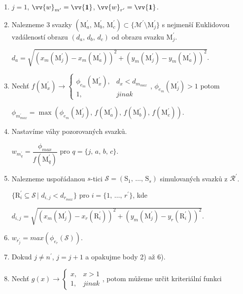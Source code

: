 \begin{enumerate}
\item $j = 1$, $\vv{w}_{m^\prime} = \vv{\mathbf{1}}$, $\vv{w}_{r^\prime} = \vv{\mathbf{1}}$. 

\item Nalezneme 3 svazky $\left(\mathrm{M}^\prime_a,\,\mathrm{M}^\prime_b,\,\mathrm{M}^\prime_c \right) \subset \lbrace \mathcal{M}^\prime\setminus \mathrm{M}^\prime_j\rbrace$ s nejmenší Euklidovou vzdáleností obrazu $\left(d_a,\,d_b,\,d_c\right)$ od obrazu svazku $\mathrm{M}^\prime_j$.

$d_a = \sqrt{\left( x_{m}(\mathrm{M}_j^\prime) -  x_{m}(\mathrm{M}_a^\prime) \right)^2 + \left( y_{m}(\mathrm{M}_j^\prime) -  y_{m}(\mathrm{M}_a^\prime) \right)^2}$.

\item Nechť $f(\mathrm{M}^\prime_x)\rightarrow \begin{cases}
\phi_{e_{m}}\left(\mathrm{M}^\prime_x \right), & d_x < d_{m_{max}}\\
1, & jinak
\end{cases}$, $\phi_{e_{m}}(\mathrm{M}^\prime_j) > 1 $ potom 

$\phi_{m^\prime_{max}} = \max\left(\phi_{e_{m}}(\mathrm{M}^\prime_j),\,f(\mathrm{M}^\prime_a),\,f(\mathrm{M}^\prime_b),\,f(\mathrm{M}^\prime_c)  \right)$. 

\item Nastavíme váhy pozorovaných svazků.

 $w_{m^\prime_{q}} = \dfrac{\phi_{max}}{f(\mathrm{M}^\prime_q)}$ pro $q = \lbrace j,\,a,\,b,\,c \rbrace$.
 
\item Nalezneme uspořádanou $s$-tici $\mathcal{S} = (\mathrm{S}_1,\,\dots,\,\mathrm{S}_s)$ simulovaných svazků z $\mathcal{R}^\prime$. 

$\lbrace \mathrm{R}^\prime_i \subseteq \mathcal{S}\,|\,\, d_{i,j} < d_{r_{max}}  \rbrace$ pro $i = \lbrace 1,\,\dots,\, r^\prime \rbrace$, kde 

$d_{i,j} = \sqrt{\left( x_{m}(\mathrm{M}_j^\prime) -  x_{r}(\mathrm{R}_i^\prime) \right)^2 + \left( y_{m}(\mathrm{M}_j^\prime) -  y_{r}(\mathrm{R}_i^\prime) \right)^2}$.

\item $w_{r^\prime_j} = max\left( \phi_{e_r}(\mathcal{S}) \right)$.

\item Dokud $j \neq n^\prime$, $j = j+1$ a opakujme body 2) až 6). 

\item Nechť  $g(x)\rightarrow \begin{cases}
x, & x > 1\\
1, & jinak
\end{cases}$, potom můžeme určit kriteriální funkci 


\end{enumerate}
